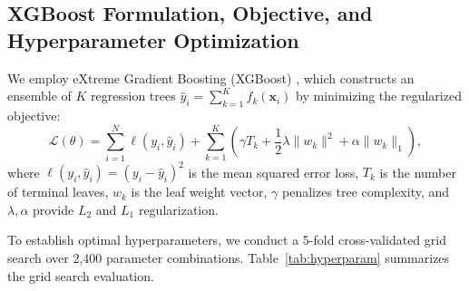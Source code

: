 \documentclass[journal]{IEEEtran}
\begin{document}
\subsection{XGBoost Formulation, Objective, and Hyperparameter Optimization}
We employ eXtreme Gradient Boosting (XGBoost) \cite{Chen2016}, which constructs an ensemble of $K$ regression trees $\hat{y}_i = \sum_{k=1}^K f_k(\mathbf{x}_i)$ by minimizing the regularized objective:
\begin{equation}
\mathcal{L}(\theta) = \sum_{i=1}^N \ell(y_i, \hat{y}_i) + \sum_{k=1}^K \left( \gamma T_k + \frac{1}{2} \lambda \| w_k \|^2 + \alpha \| w_k \|_1 \right),
\label{eq:xgboost_obj}
\end{equation}
where $\ell(y_i, \hat{y}_i) = (y_i - \hat{y}_i)^2$ is the mean squared error loss, $T_k$ is the number of terminal leaves, $w_k$ is the leaf weight vector, $\gamma$ penalizes tree complexity, and $\lambda, \alpha$ provide $L_2$ and $L_1$ regularization.

To establish optimal hyperparameters, we conduct a 5-fold cross-validated grid search over 2,400 parameter combinations. Table~\ref{tab:hyperparam} summarizes the grid search evaluation.

\begin{table}[htbp]
\caption{Hyperparameter Grid Search Optimization on Normalized Emissions ($y$)}
\label{tab:hyperparam}
\centering
{}
\end{table}
\end{document}
